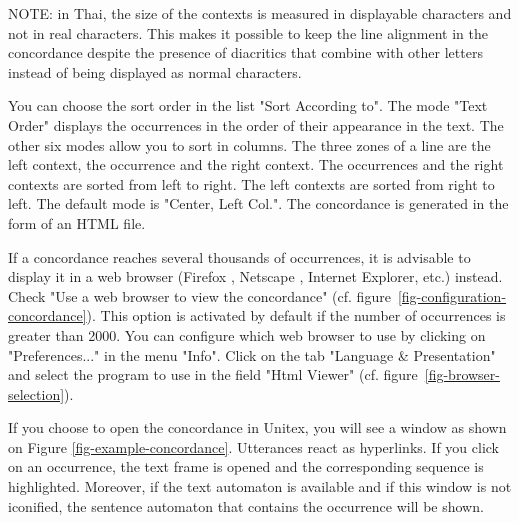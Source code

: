 \bigskip
\noindent NOTE: in Thai, the size of the contexts is measured in displayable
characters and not in real characters. This makes it possible to keep the line alignment in
the concordance despite the presence of diacritics that combine with other
letters instead of being displayed as normal characters.

\bigskip
\noindent You can choose the sort order in the list "Sort According to". The
mode "Text Order" displays the occurrences in the order of their appearance in the text. The other six
modes allow you to sort in columns. The three zones of a line are the left
context, the occurrence and the right context. The occurrences and the right
contexts are sorted from left to right. The left contexts are sorted from right
to left. The default mode is "Center, Left Col.". The concordance is generated
in the form of an HTML file.

\bigskip
\noindent If a concordance reaches several thousands of occurrences, it is advisable to
display it  in a web browser (Firefox \cite{Firefox}, Netscape \cite{Netscape},
Internet Explorer, etc.) instead. Check "Use a web
browser to view the concordance" (cf. figure~\ref{fig-configuration-concordance}). 
This option is activated by default if the number of occurrences is greater than 2000.
You can configure which web browser to use by clicking on "Preferences..." in
the menu "Info". Click on the tab "Language \& Presentation" and
select the program to use in the field "Html Viewer" 
(cf. figure~\ref{fig-browser-selection}).

\bigskip
\noindent {} If you choose to open the concordance in
Unitex, you will see a window as shown on Figure \ref{fig-example-concordance}. 
Utterances react as hyperlinks. If you click on an occurrence, the text frame is
opened and the corresponding sequence is highlighted. Moreover, if the text automaton is
available and if this window is not iconified, the sentence automaton that
contains the occurrence will be shown. 

